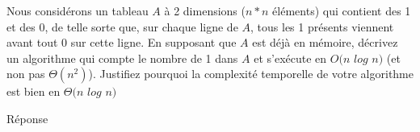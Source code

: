Nous considérons un tableau $A$ à 2 dimensions ($n * n$ éléments) qui contient des 1 et des 0, de telle sorte que, sur chaque ligne de $A$, tous les 1 présents viennent avant tout 0 sur cette ligne.
En supposant que $A$ est déjà en mémoire, décrivez un algorithme qui compte le nombre de 1 dans $A$ et s'exécute en $O(n$ $log$ $n)$ (et non pas $\Theta(n^2)$).
Justifiez pourquoi la complexité temporelle  de votre algorithme est bien en $\Theta(n$ $log$ $n)$

Réponse